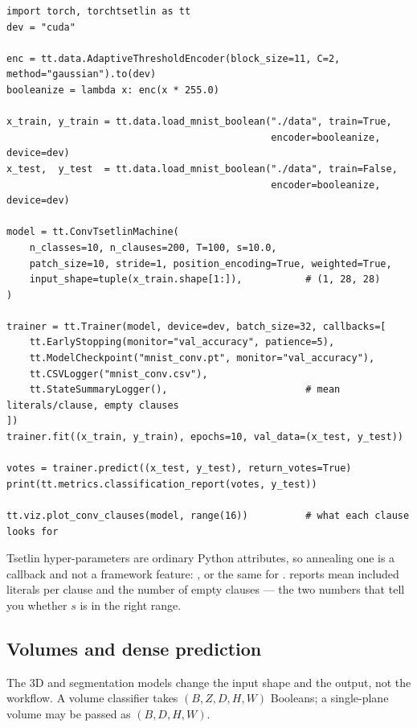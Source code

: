 \begin{lstlisting}[style=ttpython]
import torch, torchtsetlin as tt
dev = "cuda"

enc = tt.data.AdaptiveThresholdEncoder(block_size=11, C=2, method="gaussian").to(dev)
booleanize = lambda x: enc(x * 255.0)

x_train, y_train = tt.data.load_mnist_boolean("./data", train=True,
                                              encoder=booleanize, device=dev)
x_test,  y_test  = tt.data.load_mnist_boolean("./data", train=False,
                                              encoder=booleanize, device=dev)

model = tt.ConvTsetlinMachine(
    n_classes=10, n_clauses=200, T=100, s=10.0,
    patch_size=10, stride=1, position_encoding=True, weighted=True,
    input_shape=tuple(x_train.shape[1:]),           # (1, 28, 28)
)

trainer = tt.Trainer(model, device=dev, batch_size=32, callbacks=[
    tt.EarlyStopping(monitor="val_accuracy", patience=5),
    tt.ModelCheckpoint("mnist_conv.pt", monitor="val_accuracy"),
    tt.CSVLogger("mnist_conv.csv"),
    tt.StateSummaryLogger(),                        # mean literals/clause, empty clauses
])
trainer.fit((x_train, y_train), epochs=10, val_data=(x_test, y_test))

votes = trainer.predict((x_test, y_test), return_votes=True)
print(tt.metrics.classification_report(votes, y_test))

tt.viz.plot_conv_clauses(model, range(16))          # what each clause looks for
\end{lstlisting}

\begin{ttcallout}
Tsetlin hyper-parameters are ordinary Python attributes, so annealing one is a callback and
not a framework feature:
, or the same for
.  reports mean included literals per
clause and the number of empty clauses --- the two numbers that tell you whether $s$ is in the
right range.
\end{ttcallout}

\subsection{Volumes and dense prediction}

The 3D and segmentation models change the input shape and the output, not the workflow. A
volume classifier takes $(B, Z, D, H, W)$ Booleans; a single-plane volume may be passed as
$(B, D, H, W)$.

